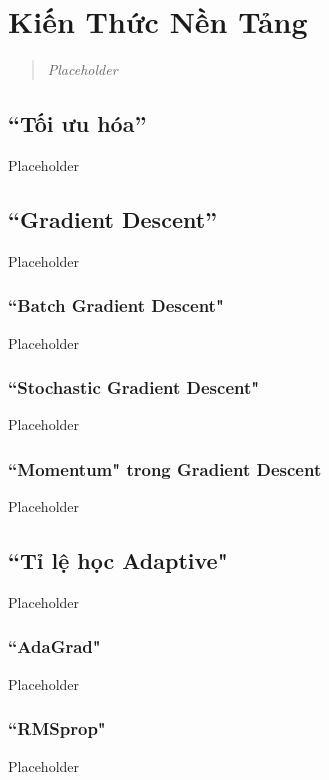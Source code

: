 \chapter{Kiến Thức Nền Tảng}

\begin{quote}
\textit{Placeholder}
\end{quote}

\section{``Tối ưu hóa''}
Placeholder

\section{``Gradient Descent''}
Placeholder
\subsection{``Batch Gradient Descent"}
Placeholder
\subsection{``Stochastic Gradient Descent"}
Placeholder
\subsection{``Momentum" trong Gradient Descent}
Placeholder
\section{``Tỉ lệ học Adaptive"}
Placeholder
\subsection{``AdaGrad"}
Placeholder
\subsection{``RMSprop"}
Placeholder

